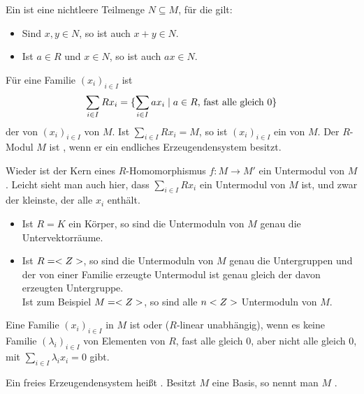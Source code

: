 \begin{definition}
	Ein  ist eine nichtleere Teilmenge $N\subseteq M$, für die gilt:
	\begin{itemize}
		\item Sind $x,y\in N$, so ist auch $x+y\in N$.
		\item Ist $a\in R$ und $x\in N$, so ist auch $ax\in N$.
	\end{itemize}

	Für eine Familie $(x_i)_{i\in I}$ ist
	\begin{align}
		\sum_{i\in I} Rx_i=\{\sum_{i\in I} ax_i\mid a\in R\text{, fast alle gleich 0}\}\notag
	\end{align}
	der von $(x_i)_{i\in I}$  von $M$. Ist $\sum_{i\in I} Rx_i=M$, so ist $(x_i)_{i\in I}$ ein  von $M$. Der $R$-Modul $M$ ist , wenn er ein endliches Erzeugendensystem besitzt.
\end{definition}

\begin{remark}
	Wieder ist der Kern eines $R$-Homomorphismus $f:M\to M'$ ein Untermodul von $M$. Leicht sieht man auch hier, dass $\sum_{i\in I} Rx_i$ ein Untermodul von $M$ ist, und zwar der kleinste, der alle $x_i$ enthält.
\end{remark}

\begin{example}
	\begin{itemize}
		\item Ist $R=K$ ein Körper, so sind die Untermoduln von $M$ genau die Untervektorräume.
		\item Ist $R=<Z>$, so sind die Untermoduln von $M$ genau die Untergruppen und der von einer Familie erzeugte Untermodul ist genau gleich der davon erzeugten Untergruppe. \\
		Ist zum Beispiel $M=<Z>$, so sind alle $n<Z>$ Untermoduln von $M$.
	\end{itemize}
\end{example}

\begin{definition}
	Eine Familie $(x_i)_{i\in I}$ in $M$ ist  oder ($R$-linear unabhängig), wenn es keine Familie $(\lambda_i)_{i\in I}$ von Elementen von $R$, fast alle gleich 0, aber nicht alle gleich 0, mit $\sum_{i\in I} \lambda_ix_i=0$ gibt.
	
	Ein freies Erzeugendensystem heißt . Besitzt $M$ eine Basis, so nennt man $M$ .
\end{definition}
